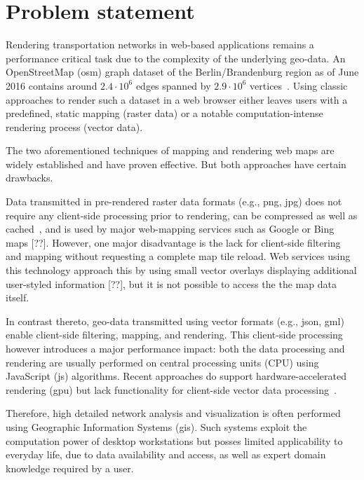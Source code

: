   \section{Problem statement}
    \label{sec:intro:probl}
    Rendering transportation networks in web-based applications remains a
    performance critical task due to the complexity of the underlying geo-data.
    An OpenStreetMap (\acrshort{osm}) graph dataset of the Berlin/Brandenburg
    region as
    of June 2016 contains around $2.4 \cdot 10^6$ edges spanned by
    $2.9 \cdot 10^6$ vertices~\cite{STHD2016}. Using
    classic approaches to render such a dataset in a web browser either
    leaves users with a predefined, static mapping (raster data) or a notable
    computation-intense rendering process (vector data).\par

    The two aforementioned techniques of mapping and rendering web maps are
    widely established and have proven effective. But both approaches have
    certain drawbacks.\par

    Data transmitted in pre-rendered raster data formats (e.g., \acrshort{png},
    \acrshort{jpg}) does
    not require any client-side processing prior to rendering, can be compressed
    as well as cached~\cite{ESRI2006}, and is used by major web-mapping services
    such as Google or Bing maps [??]. However, one major disadvantage is the
    lack for client-side filtering and mapping without requesting a complete map
    tile reload. Web services using this technology approach this by using small
    vector overlays displaying additional user-styled information [??], but it
    is not possible to access the the map data itself.\par

    In contrast thereto, geo-data transmitted using vector formats
    (e.g., \acrshort{json}, \acrshort{gml}) enable
    client-side filtering, mapping, and rendering. This client-side processing
    however introduces a major performance impact: both the data processing and
    rendering are usually performed on central processing units (CPU) using
    JavaScript (\acrshort{js}) algorithms. Recent approaches do support
    hardware-accelerated rendering (\acrshort{gpu}) but lack functionality for
    client-side vector data processing~\cite{Gaffuri2012}.

    Therefore, high detailed network analysis and visualization is often
    performed using Geographic Information Systems (\acrshort{gis}). Such
    systems
    exploit the computation power of desktop workstations but posses limited
    applicability to everyday life, due to data availability and access, as well
    as expert domain knowledge required by a user.


